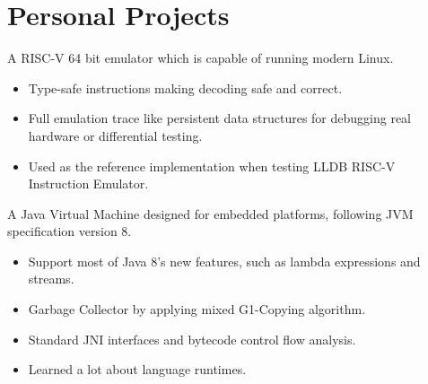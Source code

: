 \documentclass{resume}
\begin{document}
\section{Personal Projects}
A RISC-V 64 bit emulator which is capable of running modern Linux.
\begin{itemize}
  \item Type-safe instructions making decoding safe and correct.
  \item Full emulation trace like persistent data structures for debugging real hardware or differential testing.
  \item Used as the reference implementation when testing LLDB RISC-V Instruction Emulator.
\end{itemize}

A Java Virtual Machine designed for embedded platforms, following JVM specification version 8.
\begin{itemize}
  \item Support most of Java 8's new features, such as lambda expressions and streams.
  \item Garbage Collector by applying mixed G1-Copying algorithm.
  \item Standard JNI interfaces and bytecode control flow analysis.
  \item Learned a lot about language runtimes.
\end{itemize}

\end{document}
